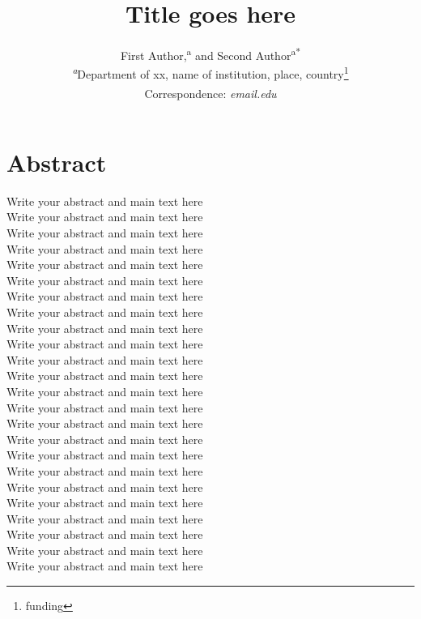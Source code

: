 \documentclass{ffds}                %
\title{Title goes here}
\author{%
First Author,\textsuperscript{a} and Second Author\textsuperscript{a*}\\
\textsuperscript{\em a}Department of xx, name of institution, place, country\footnote[1]{funding}\\
\textsuperscript{\em *}Correspondence: \textit{email.edu}
}
\begin{document}
\maketitle
%

\section{Abstract}
Write your abstract and main text here\\
Write your abstract and main text here\\
Write your abstract and main text here\\
Write your abstract and main text here\\
Write your abstract and main text here\\
Write your abstract and main text here\\
Write your abstract and main text here\\
Write your abstract and main text here\\
Write your abstract and main text here\\
Write your abstract and main text here\\
Write your abstract and main text here\\
Write your abstract and main text here\\
Write your abstract and main text here\\
Write your abstract and main text here\\
Write your abstract and main text here\\
Write your abstract and main text here\\
Write your abstract and main text here\\
Write your abstract and main text here\\
Write your abstract and main text here\\
Write your abstract and main text here\\
Write your abstract and main text here\\
Write your abstract and main text here\\
Write your abstract and main text here\\
Write your abstract and main text here\\
\end{document}
